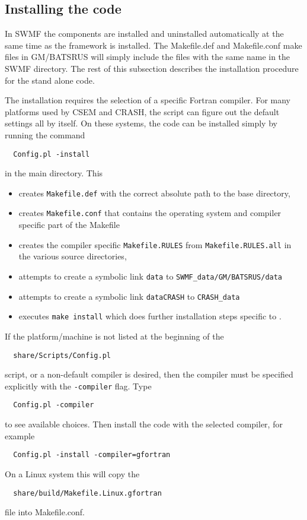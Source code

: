 \subsection{Installing the code}

In SWMF the components are installed and uninstalled automatically 
at the same time as the framework is installed.
The Makefile.def and Makefile.conf make files in GM/BATSRUS will 
simply include the files with the same name in the SWMF directory.
The rest of this subsection describes the installation procedure
for the stand alone code.
 
The installation requires the selection of a specific Fortran compiler. 
For many platforms used by CSEM and CRASH, the script can figure out 
the default settings all by itself. 
On these systems, the code can be installed simply by running the command
\begin{verbatim}
  Config.pl -install
\end{verbatim}
in the main directory. This
\begin{itemize}
\item creates {\tt Makefile.def} with the correct 
      absolute path to the base directory, 
\item creates {\tt Makefile.conf} that contains the operating 
      system and compiler specific part of the Makefile
\item creates the compiler specific {\tt Makefile.RULES} from
      {\tt Makefile.RULES.all} in the various source directories,
\item attempts to create a symbolic link {\tt data} to {\tt SWMF\_data/GM/BATSRUS/data}
\item attempts to create a symbolic link {\tt dataCRASH} to {\tt CRASH\_data}
\item executes {\tt make install} which does further
      installation steps specific to \BATSRUS. 
\end{itemize}
If the platform/machine is not listed at the beginning of the
\begin{verbatim}
  share/Scripts/Config.pl
\end{verbatim}
script, or a non-default compiler is desired, then the compiler 
must be specified explicitly with the {\tt -compiler} flag. Type 
\begin{verbatim}
  Config.pl -compiler
\end{verbatim}
to see available choices. Then install the code with the selected compiler,
for example 
\begin{verbatim}
  Config.pl -install -compiler=gfortran
\end{verbatim}
On a Linux system this will copy the
\begin{verbatim}
  share/build/Makefile.Linux.gfortran
\end{verbatim}
file into Makefile.conf. 

